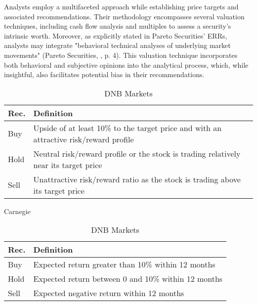 Analysts employ a multifaceted approach while establishing price targets and associated recommendations. Their methodology encompasses several valuation techniques, including cash flow analysis and multiples to assess a security's intrinsic worth. Moreover, as explicitly stated in Pareto Securities' ERRs, analysts may integrate "behavioral technical analyses of underlying market movements" (Pareto Securities, \cite*{paretoAdevinta}, p. 4). This valuation technique incorporates both behavioral and subjective opinions into the analytical process, which, while insightful, also facilitates potential bias in their recommendations.
\begin{table}[!h]
    \centering
    \footnotesize %
    \setlength{\tabcolsep}{4pt} %
    
    \begin{subtable}{\textwidth}
        \begin{tabularx}{\linewidth}{ll}
            \toprule
            \textbf{Rec.} & \textbf{Definition} \\ 
            \midrule
            Buy & Upside of at least 10\% to the target price and with an attractive risk/reward profile \\
            Hold & Neutral risk/reward profile or the stock is trading relatively near its target price \\ 
            Sell & Unattractive risk/reward ratio as the stock is trading above its target price \\
            \bottomrule
        \end{tabularx}
        \caption{Carnegie}
        \label{subtab:carnegie}
    \end{subtable}

    \begin{subtable}{\textwidth}
        \begin{tabularx}{\linewidth}{ll}
            \toprule
            \textbf{Rec.} & \textbf{Definition} \\ 
            \midrule
            Buy & Expected return greater than 10\% within 12 months \\
            Hold & Expected return between 0 and 10\% within 12 months \\ 
            Sell & Expected negative return within 12 months \\
            \bottomrule
        \end{tabularx}
        \caption{DNB Markets}
        \label{subtab:dnb}
    \end{subtable}


\end{table}
